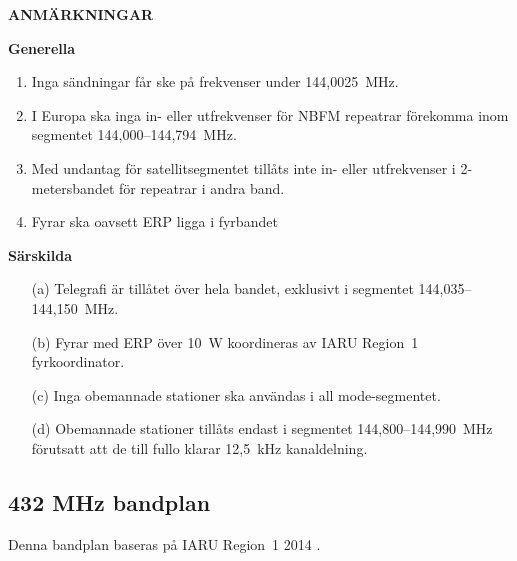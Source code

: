 \textbf{ANMÄRKNINGAR}

\textbf{Generella}
\begin{enumerate}[label=\alph*.]
\item Inga sändningar får ske på frekvenser under 144,0025~MHz.
\item I Europa ska inga in- eller utfrekvenser för NBFM repeatrar
  förekomma inom segmentet 144,000--144,794~MHz.
\item Med undantag för satellitsegmentet tillåts inte in- eller
  utfrekvenser i 2-metersbandet för repeatrar i andra band.
\item Fyrar ska oavsett ERP ligga i fyrbandet
\end{enumerate}

\textbf{Särskilda}
\begin{itemize}
\item[(a)] Telegrafi är tillåtet över hela bandet, exklusivt i segmentet
  144,035--144,150~MHz.
\item[(b)] Fyrar med ERP över 10~W koordineras av IARU Region~1 fyrkoordinator.
\item[(c)] Inga obemannade stationer ska användas i all mode-segmentet.
\item[(d)] Obemannade stationer tillåts endast i segmentet 144,800--144,990~MHz
förutsatt att de till fullo klarar 12,5~kHz kanaldelning.
\end{itemize}

\subsection{432 MHz bandplan}
\label{432MHzbandplan}
Denna bandplan baseras på IARU Region~1 2014 \cite{IARU1}.

